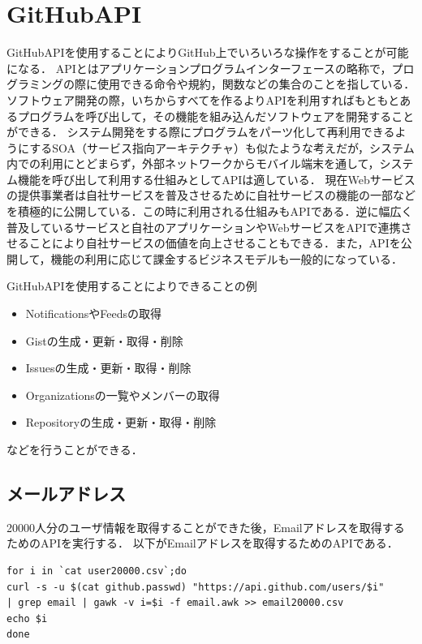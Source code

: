  \section{GitHubAPI}
GitHubAPIを使用することによりGitHub上でいろいろな操作をすることが可能になる．
APIとはアプリケーションプログラムインターフェースの略称で，プログラミングの際に使用できる命令や規約，関数などの集合のことを指している．ソフトウェア開発の際，いちからすべてを作るよりAPIを利用すればもともとあるプログラムを呼び出して，その機能を組み込んだソフトウェアを開発することができる．
システム開発をする際にプログラムをパーツ化して再利用できるようにするSOA（サービス指向アーキテクチャ）も似たような考えだが，システム内での利用にとどまらず，外部ネットワークからモバイル端末を通して，システム機能を呼び出して利用する仕組みとしてAPIは適している．
現在Webサービスの提供事業者は自社サービスを普及させるために自社サービスの機能の一部などを積極的に公開している．この時に利用される仕組みもAPIである．逆に幅広く普及しているサービスと自社のアプリケーションやWebサービスをAPIで連携させることにより自社サービスの価値を向上させることもできる．また，APIを公開して，機能の利用に応じて課金するビジネスモデルも一般的になっている．

GitHubAPIを使用することによりできることの例
\begin{itemize}
 \item NotificationsやFeedsの取得
 \item Gistの生成・更新・取得・削除
 \item Issuesの生成・更新・取得・削除
 \item Organizationsの一覧やメンバーの取得
 \item Repositoryの生成・更新・取得・削除
\end{itemize}
などを行うことができる．

\newpage


\subsection{メールアドレス}
20000人分のユーザ情報を取得することができた後，Emailアドレスを取得するためのAPIを実行する．
以下がEmailアドレスを取得するためのAPIである．


\begin{lstlisting}[basicstyle=\ttfamily\footnotesize, frame=single]
for i in `cat user20000.csv`;do
curl -s -u $(cat github.passwd) "https://api.github.com/users/$i" 
| grep email | gawk -v i=$i -f email.awk >> email20000.csv
echo $i
done
\end{lstlisting}



